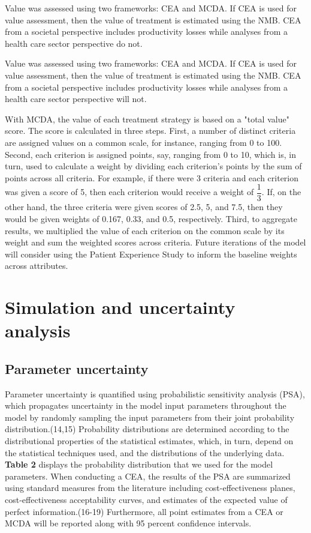 \documentclass[11pt,final,fleqn]{article}\usepackage[]{graphicx}\usepackage[]{color}
\theoremstyle{plain}
\begin{document}
{Value was assessed using two frameworks: CEA and MCDA. If CEA is used for value assessment, then the value of treatment is estimated using the NMB. CEA from a societal perspective includes productivity losses while analyses from a health care sector perspective do not.

Value was assessed using two frameworks: CEA and MCDA. If CEA is used for value assessment, then the value of treatment is estimated using the NMB. CEA from a societal perspective includes productivity losses while analyses from a health care sector perspective will not. 

With MCDA, the value of each treatment strategy is based on a "total value" score. The score is calculated in three steps. First, a number of distinct criteria are assigned values on a common scale, for instance, ranging from 0 to 100. Second, each criterion is assigned points, say, ranging from 0 to 10, which is, in turn, used to calculate a weight by dividing each criterion's points by the sum of points across all criteria. For example, if there were 3 criteria and each criterion was given a score of 5, then each criterion would receive a weight of $ \dfrac{1}{3} $. If, on the other hand, the three criteria were given scores of 2.5, 5, and 7.5, then they would be given weights of 0.167, 0.33, and 0.5, respectively. Third, to aggregate results, we multiplied the value of each criterion on the common scale by its weight and sum the weighted scores across criteria. Future iterations of the model will consider using the Patient Experience Study to inform the baseline weights across attributes. 


\section{Simulation and uncertainty analysis}\label{sec:uncertainty-analysis}

\subsection{Parameter uncertainty}

Parameter uncertainty is quantified using probabilistic sensitivity analysis (PSA), which propagates uncertainty in the model input parameters throughout the model by randomly sampling the input parameters from their joint probability distribution.(14,15) Probability distributions are determined according to the distributional properties of the statistical estimates, which, in turn, depend on the statistical techniques used, and the distributions of the underlying data. \textbf{Table 2} displays the probability distribution that we used for the model parameters. When conducting a CEA, the results of the PSA are summarized using standard measures from the literature including cost-effectiveness planes, cost-effectiveness acceptability curves, and estimates of the expected value of perfect information.(16-19) Furthermore, all point estimates from a CEA or MCDA will be reported along with 95 percent confidence intervals. 

}
\end{document}
